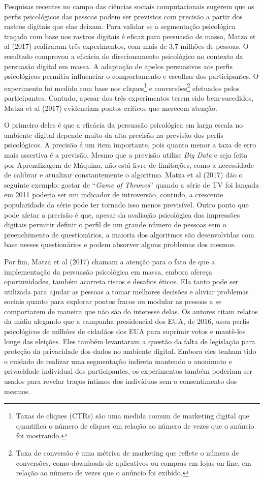 Pesquisas recentes no campo das ciências sociais computacionais sugerem
que os perfis psicológicos das pessoas podem ser previstos com precisão
a partir dos rastros digitais que elas deixam. Para validar se a
segmentação psicológica traçada com base nos rastros digitais é eficaz
para persuasão de massa, Matza et al (2017) realizaram três
experimentos, com mais de 3,7 milhões de pessoas. O resultado comprovou
a eficácia do direcionamento psicológico no contexto da persuasão
digital em massa. A adaptação de apelos persuasivos aos perfis
psicológicos permitiu influenciar o comportamento e escolhas dos
participantes. O experimento foi medido com base nos cliques\footnote{Taxas
  de cliques (CTRs) são uma medida comum de marketing digital que
  quantifica o número de cliques em relação ao número de vezes que o
  anúncio foi mostrando.} e conversões\footnote{Taxa de conversão é uma
  métrica de marketing que reflete o número de conversões, como
  downloads de aplicativos ou compras em lojas on-line, em relação ao
  número de vezes que o anúncio foi exibido.} efetuados pelos
participantes. Contudo, apesar dos três experimentos terem sido
bem-sucedidos, Matza et al (2017) evidenciam pontos críticos que merecem
atenção.

O primeiro deles é que a eficácia da persuasão psicológica em larga
escala no ambiente digital depende muito da alta precisão na previsão
dos perfis psicológicos. A precisão é um item importante, pois quanto
menor a taxa de erro mais assertiva é a previsão. Mesmo que a previsão
utilize \emph{Big Data} e seja feita por Aprendizagem de Máquina, não
está livre de limitações, como a necessidade de calibrar e atualizar
constantemente o algoritmo. Matza et al (2017) dão o seguinte exemplo:
gostar de ``\emph{Game of Thrones}'' quando a série de TV foi lançada em
2011 poderia ser um indicador de introversão, contudo, a crescente
popularidade da série pode ter tornado isso menos previsível. Outro
ponto que pode afetar a precisão é que, apesar da avaliação psicológica
das impressões digitais permitir definir o perfil de um grande número de
pessoas sem o preenchimento de questionários, a maioria dos algoritmos
são desenvolvidas com base nesses questionários e podem absorver alguns
problemas dos mesmos.

Por fim, Matza et al (2017) chamam a atenção para o fato de que a
implementação da persuasão psicológica em massa, embora ofereça
oportunidades, também acarreta riscos e desafios éticos. Ela tanto pode
ser utilizada para ajudar as pessoas a tomar melhores decisões e aliviar
problemas sociais quanto para explorar pontos fracos ou modular as
pessoas a se comportarem de maneira que não são do interesse delas. Os
autores citam relatos da mídia alegando que a campanha presidencial dos
EUA, de 2016, usou perfis psicológicos de milhões de cidadãos dos EUA
para suprimir votos e mantê-los longe das eleições. Eles também
levantaram a questão da falta de legislação para proteção da privacidade
dos dados no ambiente digital. Embora eles tenham tido o cuidado de
realizar uma segmentação indireta mantendo o anonimato e privacidade
individual dos participantes, os experimentos também poderiam ser usados
para revelar traços íntimos dos indivíduos sem o consentimento dos
mesmos.

